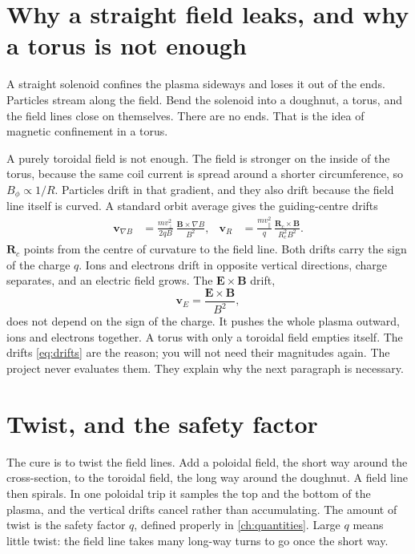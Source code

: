 \documentclass[11pt,a4paper,oneside,openany]{book}
\numberwithin{equation}{chapter}
\newcommand{\grad}{\nabla}
\theoremstyle{definition}
\begin{document}
\section{Why a straight field leaks, and why a torus is not enough}

A straight solenoid confines the plasma sideways and loses it out of the ends. Particles stream along the field. Bend the solenoid into a doughnut, a torus, and the field lines close on themselves. There are no ends. That is the idea of magnetic confinement in a torus.

A purely toroidal field is not enough. The field is stronger on the inside of the torus, because the same coil current is spread around a shorter circumference, so \(B_{\phi}\propto 1/R\). Particles drift in that gradient, and they also drift because the field line itself is curved. A standard orbit average gives the guiding-centre drifts
\begin{align}
\label{eq:drifts}
\mathbf{v}_{\grad B}
&=\frac{m v_{\perp}^{2}}{2q B}\,\frac{\mathbf{B}\times\grad B}{B^{2}},
&
\mathbf{v}_{R}
&=\frac{m v_{\parallel}^{2}}{q}\,
\frac{\mathbf{R}_{c}\times\mathbf{B}}{R_{c}^{2} B^{2}}.
\end{align}
\(\mathbf{R}_{c}\) points from the centre of curvature to the field line. Both drifts carry the sign of the charge \(q\). Ions and electrons drift in opposite vertical directions, charge separates, and an electric field grows. The \(\mathbf{E}\times\mathbf{B}\) drift,
\begin{equation}
\label{eq:exb}
\mathbf{v}_{E}=\frac{\mathbf{E}\times\mathbf{B}}{B^{2}},
\end{equation}
does not depend on the sign of the charge. It pushes the whole plasma outward, ions and electrons together. A torus with only a toroidal field empties itself. The drifts \eqref{eq:drifts} are the reason; you will not need their magnitudes again. The project never evaluates them. They explain why the next paragraph is necessary.

\section{Twist, and the safety factor}

The cure is to twist the field lines. Add a poloidal field, the short way around the cross-section, to the toroidal field, the long way around the doughnut. A field line then spirals. In one poloidal trip it samples the top and the bottom of the plasma, and the vertical drifts cancel rather than accumulating. The amount of twist is the safety factor \(q\), defined properly in \cref{ch:quantities}. Large \(q\) means little twist: the field line takes many long-way turns to go once the short way.
\end{document}
